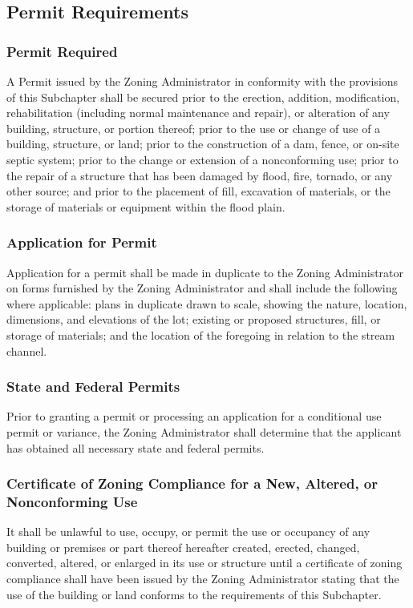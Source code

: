 \subsection{Permit Requirements}
\subsubsection{Permit Required}
A Permit issued by the Zoning Administrator in conformity with the provisions of this Subchapter shall be secured prior to the erection, addition, modification, rehabilitation (including normal maintenance and repair), or alteration of any building, structure, or portion thereof; prior to the use or change of use of a building, structure, or land; prior to the construction of a dam, fence, or on-site septic system; prior to the change or extension of a nonconforming use; prior to the repair of a structure that has been damaged by flood, fire, tornado, or any other source; and prior to the placement of fill, excavation of materials, or the storage of materials or equipment within the flood plain.
\subsubsection{Application for Permit}
Application for a permit shall be made in duplicate to the Zoning Administrator on forms furnished by the Zoning Administrator and shall include the following where applicable: plans in duplicate drawn to scale, showing the nature, location, dimensions, and elevations of the lot; existing or proposed structures, fill, or storage of materials; and the location of the foregoing in relation to the stream channel.
\subsubsection{State and Federal Permits}
Prior to granting a permit or processing an application for a conditional use permit or variance, the Zoning Administrator shall determine that the applicant has obtained all necessary state and federal permits.
\subsubsection{Certificate of Zoning Compliance for a New, Altered, or Nonconforming Use}
It shall be unlawful to use, occupy, or permit the use or occupancy of any building or premises or part thereof hereafter created, erected, changed, converted, altered, or enlarged in its use or structure until a certificate of zoning compliance shall have been issued by the Zoning Administrator stating that the use of the building or land conforms to the requirements of this Subchapter.
